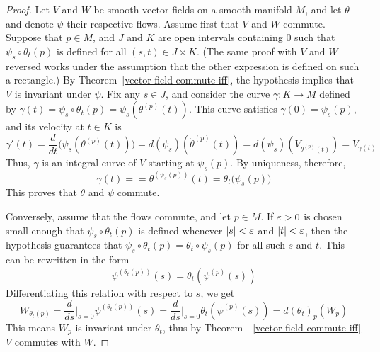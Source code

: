 \begin{proof}
Let $V$ and $W$ be smooth vector fields on a smooth manifold $M$, and let $\theta$ and denote $\psi$ their respective flows. Assume first that $V$ and $W$ commute. Suppose that $p\in M$, and $J$ and $K$ are open intervals containing $0$ such that $\psi_s\circ\theta_t(p)$ is defined for all $(s,t)\in J\times K$. (The same proof with $V$ and $W$ reversed works under the assumption that the other expression is defined on such a rectangle.) By Theorem~\ref{vector field commute iff}, the hypothesis implies that $V$ is invariant under $\psi$. Fix any $s\in J$, and consider the curve $\gamma:K\to M$ defined by $\gamma(t)=\psi_s\circ\theta_t(p)=\psi_s(\theta^{(p)}(t))$. This curve satisfies $\gamma(0)=\psi_s(p)$, and its velocity at $t\in K$ is
\[\gamma'(t)=\frac{d}{dt}\big(\psi_s(\theta^{(p)}(t))\big)=d(\psi_s)(\dot{\theta}^{(p)}(t))=d(\psi_s)(V_{\theta^{(p)}(t)})=V_{\gamma(t)}\]
Thus, $\gamma$ is an integral curve of $V$ starting at $\psi_s(p)$. By uniqueness, therefore,
\[\gamma(t)==\theta^{(\psi_s(p))}(t)=\theta_t\big(\psi_s(p)\big)\]
This proves that $\theta$ and $\psi$ commute.\par
Conversely, assume that the flows commute, and let $p\in M$. If $\varepsilon>0$ is chosen
small enough that $\psi_s\circ\theta_t(p)$ is defined whenever $|s|<\varepsilon$ and $|t|<\varepsilon$, then the hypothesis guarantees that $\psi_s\circ\theta_t(p)=\theta_t\circ\psi_s(p)$ for all such $s$ and $t$. This can be rewritten in the form
\[\psi^{(\theta_t(p))}(s)=\theta_t(\psi^{(p)}(s))\]
Differentiating this relation with respect to $s$, we get
\[W_{\theta_t(p)}=\frac{d}{ds}\Big|_{s=0}\psi^{(\theta_t(p))}(s)=\frac{d}{ds}\Big|_{s=0}\theta_t(\psi^{(p)}(s))=d(\theta_t)_p(W_p)\]
This means $W_p$ is invariant under $\theta_t$, thus by Theorem~~\ref{vector field commute iff} $V$ commutes with $W$.
\end{proof}

